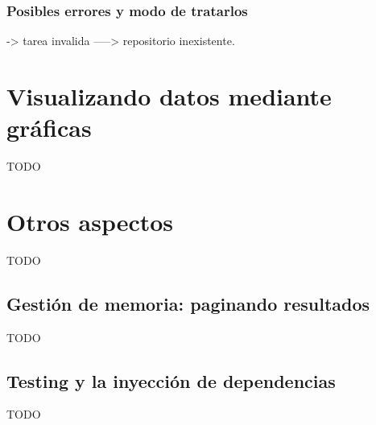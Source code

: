 
\subsubsection{Posibles errores y modo de tratarlos}

-> tarea invalida
-----> repositorio inexistente.

\section{Visualizando datos mediante gráficas}

TODO

\section{Otros aspectos}

TODO

\subsection{Gestión de memoria: paginando resultados}

TODO

\subsection{Testing y la inyección de dependencias}

TODO